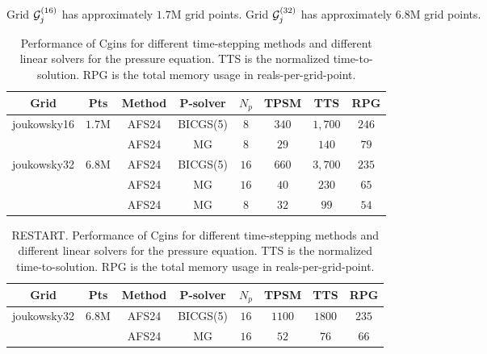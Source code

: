 Grid ${\mathcal G}_j^{(16)}$ has approximately $1.7$M grid points.
Grid ${\mathcal G}_j^{(32)}$ has approximately $6.8$M grid points.

\begin{table}[hbt]
\begin{center}
\begin{tabular}{|c|c|c|c|c|c|c|c|} \hline 
   Grid          &  Pts     & Method   & P-solver  &   $N_p$  & TPSM     & TTS      &  RPG      \\ \hline
 joukowsky16     & $1.7$M   & AFS24    &  BICGS(5) &  $8 $    & $340$    & $1,700$ & $246$     \\ 
                 &          & AFS24    &  MG       &  $8 $    & $29 $    & $140$  & $79 $     \\ 
\hline
 joukowsky32     & $6.8$M   & AFS24    &  BICGS(5) &  $16$    & $660$    & $3,700$ & $235$     \\ 
                 &          & AFS24    &  MG       &  $16$    & $ 40$    & $230 $ & $ 65$     \\ 
                 &          & AFS24    &  MG       &  $ 8$    & $ 32$    & $  99 $ & $ 54$     \\ 
\hline 
\end{tabular}
\end{center}
\caption{Performance of Cgins for different time-stepping methods and different linear solvers for the
   pressure equation. TTS is the normalized time-to-solution. 
RPG is the total memory usage in reals-per-grid-point.
}
\label{tab:performancePitchingPlunging} 
\end{table}


\begin{table}[hbt]
\begin{center}
\begin{tabular}{|c|c|c|c|c|c|c|c|} \hline 
   Grid          &  Pts     & Method   & P-solver  &   $N_p$  & TPSM     & TTS      &  RPG      \\ \hline
 joukowsky32     & $6.8$M   & AFS24    &  BICGS(5) &  $16$    & $1100$   & $1800$   & $235$     \\ 
                 &          & AFS24    &  MG       &  $16$    & $ 52$    & $ 76 $   & $ 66$     \\ 
\hline 
\end{tabular}
\end{center}
\caption{RESTART. Performance of Cgins for different time-stepping methods and different linear solvers for the
   pressure equation. TTS is the normalized time-to-solution. 
RPG is the total memory usage in reals-per-grid-point.
}
\label{tab:performancePitchingPlungingII} 
\end{table}